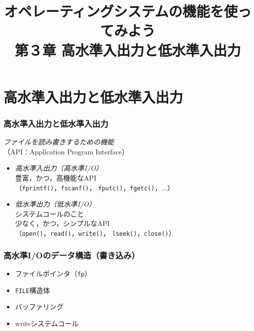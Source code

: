 \documentclass{beamer}                 %
\begin{document}
\title{オペレーティングシステムの機能を使ってみよう\\
第３章 高水準入出力と低水準入出力}
\date{}

\begin{frame}
  \titlepage
\end{frame}


\section{高水準入出力と低水準入出力}
\begin{frame}
  \frametitle{高水準入出力と低水準入出力}
  \emph{ファイルを読み書きするための機能} \\
  （API：Application Program Interface）
  \begin{itemize}
  \item \emph{高水準入出力（高水準I/O）} \\
    豊富，かつ，高機能なAPI\\
    （\texttt{fprintf()}，\texttt{fscanf()}，
      \texttt{fputc()}，\texttt{fgetc()}，...）
  \item \emph{低水準出力（低水準I/O）} \\
    システムコールのこと \\
    少なく，かつ，シンプルなAPI \\
    （\texttt{open()}，\texttt{read()}，\texttt{write()}，
      \texttt{lseek()}，\texttt{close()}）
  \end{itemize}
\end{frame}

\begin{frame}
  \frametitle{高水準I/Oのデータ構造（書き込み）}
  \begin{itemize}
  \item ファイルポインタ（\texttt{fp}）
  \item \texttt{FILE}構造体
  \item バッファリング
  \item writeシステムコール
  \end{itemize}
\end{frame}
\end{document}
